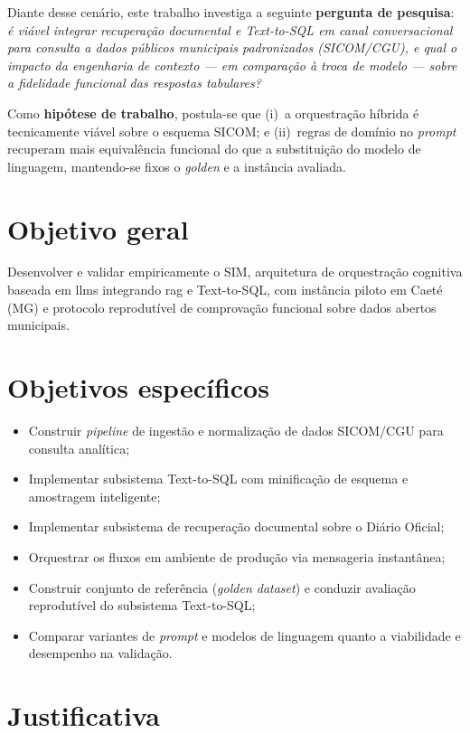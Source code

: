 Diante desse cenário, este trabalho investiga a seguinte \textbf{pergunta de pesquisa}: \emph{é viável integrar recuperação documental e Text-to-SQL em canal conversacional para consulta a dados públicos municipais padronizados (SICOM/CGU), e qual o impacto da engenharia de contexto --- em comparação à troca de modelo --- sobre a fidelidade funcional das respostas tabulares?}

Como \textbf{hipótese de trabalho}, postula-se que (i)~a orquestração híbrida é tecnicamente viável sobre o esquema SICOM; e (ii)~regras de domínio no \textit{prompt} recuperam mais equivalência funcional do que a substituição do modelo de linguagem, mantendo-se fixos o \textit{golden} e a instância avaliada.

\section{Objetivo geral}

Desenvolver e validar empiricamente o SIM, arquitetura de orquestração cognitiva baseada em \gls{llm}s integrando \gls{rag} e Text-to-SQL, com instância piloto em Caeté (MG) e protocolo reprodutível de comprovação funcional sobre dados abertos municipais.

\section{Objetivos específicos}

\begin{itemize}
    \item Construir \textit{pipeline} de ingestão e normalização de dados SICOM/CGU para consulta analítica;
    \item Implementar subsistema Text-to-SQL com minificação de esquema e amostragem inteligente;
    \item Implementar subsistema de recuperação documental sobre o Diário Oficial;
    \item Orquestrar os fluxos em ambiente de produção via mensageria instantânea;
    \item Construir conjunto de referência (\textit{golden dataset}) e conduzir avaliação reprodutível do subsistema Text-to-SQL;
    \item Comparar variantes de \textit{prompt} e modelos de linguagem quanto a viabilidade e desempenho na validação.
\end{itemize}

\section{Justificativa}

